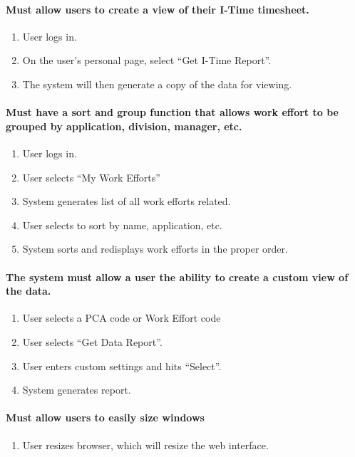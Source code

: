 \documentclass[letterpaper]{article}
\begin{document}
\paragraph{Must allow users to create a view of their I-Time timesheet.}
\begin{enumerate}
\item User logs in.
\item On the user's personal page, select ``Get I-Time Report''.
\item The system will then generate a copy of the data for viewing.
\end{enumerate}

\paragraph{Must have a sort and group function that allows work effort to be grouped by application, division, manager, etc.}
\begin{enumerate}
\item User logs in.
\item User selects ``My Work Efforts''
\item System generates list of all work efforts related.
\item User selects to sort by name, application, etc.
\item System sorts and redisplays work efforts in the proper order.
\end{enumerate}

\paragraph{The system must allow a user the ability to create a custom view of the data.}
\begin{enumerate}
\item User selects a PCA code or Work Effort code
\item User selects ``Get Data Report''.
\item User enters custom settings and hits ``Select''.
\item System generates report.
\end{enumerate}

\paragraph{Must allow users to easily size windows}
\begin{enumerate}
\item User resizes browser, which will resize the web interface.
\end{enumerate}
\end{document}
